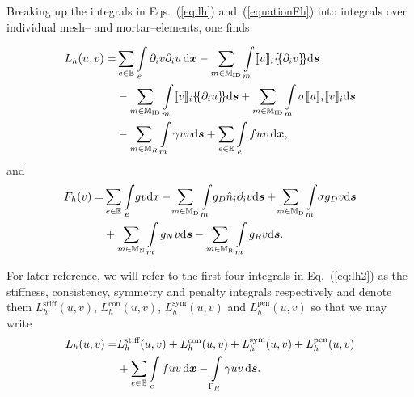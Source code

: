 Breaking up the integrals in Eqs.~(\ref{eq:lh}) and~(\ref{equationFh}) into integrals over individual mesh-- and
mortar--elements, one finds

\begin{align} 
  \label{eq:lh2}
 \nonumber
 L_h(u,v)
 =&
 \sum_{e\in\mathbb{E}}\int\displaylimits_{e}  \partial_i v\partial_i u \,\mathrm{d}\tv{x}
 - \sum_{m \in \mathbb{M}_{\rm ID}}\int\displaylimits_m \llbracket u \rrbracket_i \dgal*{\partial_i v}\mathrm{d}\tv s \\ \nonumber
 &
 - \sum_{m \in \mathbb{M}_{\rm ID}}\int\displaylimits_m \llbracket v \rrbracket_i \dgal*{\partial_i u} \mathrm{d}\tv s  
 +\sum_{m \in \mathbb{M}_{\rm ID}}\int\displaylimits_m\sigma \llbracket u \rrbracket_i \llbracket v \rrbracket_i \mathrm{d}\tv s \\ & -\sum_{m \in \mathbb{M}_{R}}\int\displaylimits_m\gamma u v \mathrm{d}\tv s 
 + \sum_{e\in\mathbb{E}}\int\displaylimits_{e}f u v \,\mathrm{d}\tv{x},
\end{align}
%
and
%
\begin{align}
  \label{equationFh2}
\nonumber
F_h(v)
=& \sum_{e\in\mathbb{E}}\int\displaylimits_{e}\! gv \mathrm{d}x
- \!\sum_{m \in \mathbb{M}_{\rm D}}\int\displaylimits_m \!g_D \hat n_i \partial_i v \mathrm{d}\boldsymbol{s}
+\! \sum_{m \in \mathbb{M}_{\rm D}}\int\displaylimits_m\! \sigma g_D v \mathrm{d}\boldsymbol{s} \\
  &+
\sum_{m \in \mathbb{M}_{\rm N}}\int\displaylimits_m g_Nv\mathrm{d}\boldsymbol{s} - \sum_{m \in \mathbb{M}_{\rm R}}\int\displaylimits_m g_Rv\mathrm{d}\boldsymbol{s}.
\end{align}

For later reference, we will refer to the first four integrals in
Eq.~(\ref{eq:lh2}) as the stiffness, consistency, symmetry and
penalty integrals respectively and denote them
$L^{\text{stiff}}_h(u,v)$, $L^{\text{con}}_h(u,v)$,
$L^{\text{sym}}_h(u,v)$ and $L^{\text{pen}}_h(u,v)$ so that we may
write
%
\begin{align}
  \nonumber
  \label{eq:lh3}
  L_h(u,v) = &L^{\text{stiff}}_h(u,v) + L^{\text{con}}_h(u,v) + L^{\text{sym}}_h(u,v) 
  + L^{\text{pen}}_h(u,v)\\
  &+ \sum_{e\in\mathbb{E}}\int\displaylimits_{e}f u v \,\mathrm{d}\boldsymbol{x} - \int\displaylimits_{\Gamma_R} \gamma u v \,\mathrm{d}\boldsymbol{s}.
\end{align}
%

